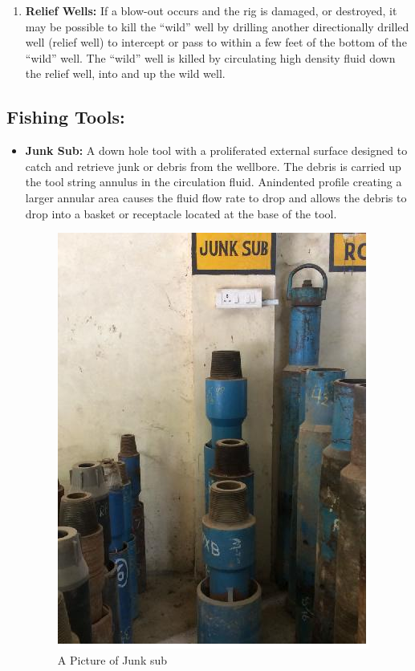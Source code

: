 \begin{enumerate}
\item \textbf{Relief Wells:} If a blow-out occurs and the rig is
damaged, or destroyed, it may be possible to kill
the “wild” well by drilling another directionally
drilled well (relief well) to intercept or pass to
within a few feet of the bottom of the “wild”
well. The “wild” well is killed by circulating
high density fluid down the relief well, into and
up the wild well.

\end{enumerate}



\subsection*{Fishing Tools:}

\begin{itemize}

\item \textbf{Junk Sub:} A down hole tool with a proliferated external surface
designed to catch and retrieve junk or debris from the wellbore. The
debris is carried up the tool string annulus in the circulation fluid. Anindented profile creating a larger annular area causes the fluid flow
rate to drop and allows the debris to drop into a basket or receptacle
located at the base of the tool.

\begin{figure}[h]
\includegraphics[scale=0.3]{images/junksub}
\centering 
\caption{A Picture of Junk sub}
\end{figure}



\end{itemize}
